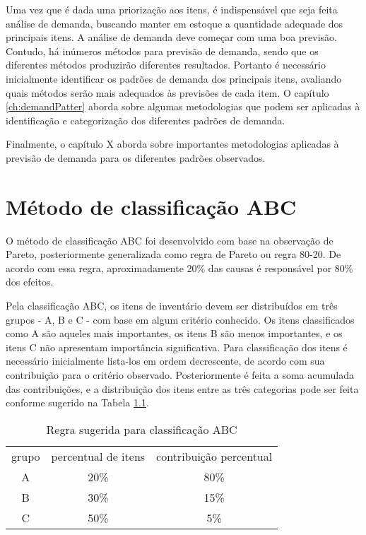 \documentclass{book}
\begin{document}
Uma vez que é dada uma priorização aos itens, é indispensável que seja feita análise de demanda, buscando manter em estoque a quantidade adequade dos principais itens. A análise de demanda deve começar com uma boa previsão. Contudo, há inúmeros métodos para previsão de demanda, sendo que os diferentes métodos produzirão diferentes resultados. Portanto é necessário inicialmente identificar os padrões de demanda dos principais itens, avaliando quais métodos serão mais adequados às previsões de cada item. O capítulo \ref{ch:demandPatter} aborda sobre algumas metodologias que podem ser aplicadas à identificação e categorização dos diferentes padrões de demanda.

Finalmente, o capítulo X aborda sobre importantes metodologias aplicadas à previsão de demanda para os diferentes padrões observados.

\chapter{Método de classificação ABC}
\label{ch:ABC}

O método de classificação ABC foi desenvolvido com base na observação de Pareto, posteriormente generalizada como regra de Pareto ou regra 80-20. De acordo com essa regra, aproximadamente 20\% das causas é responsável por 80\% dos efeitos.

Pela classificação ABC, os itens de inventário devem ser distribuídos em três grupos - A, B e C - com base em algum critério conhecido. Os itens classificados como A são aqueles mais importantes, os itens B são menos importantes, e os itens C não apresentam importância significativa. Para classificação dos itens é necessário inicialmente lista-los em ordem decrescente, de acordo com sua contribuição para o critério observado. Posteriormente é feita a soma acumulada das contribuições, e a distribuição dos itens entre as três categorias pode ser feita conforme sugerido na Tabela \ref{tab:ABCRules}. \\

\begin{table}[h]
\begin{center}
\begin{tabular}[c]{c c c}
\cline {1-3}
grupo & percentual de itens & contribuição percentual \\ \cline {1-3}
A & 20\% &  80\%   \\ 
B & 30\% &  15\%   \\
C & 50\% &  5\% \\ 
\cline {1-3}
\end{tabular}
\caption{Regra sugerida para classificação ABC}
\label{tab:ABCRules}
\end{center}
\end{table}
\end{document}
